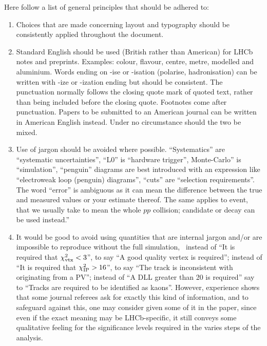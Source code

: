 Here follow a list of general principles that should be adhered to:
\begin{enumerate}

\item Choices that are made concerning layout and typography
  should be consistently applied throughout the document.

\item Standard English should be used (British rather than American)
  for LHCb notes and preprints. Examples: colour, flavour, centre,
  metre, modelled and aluminium. Words ending on -ise or -isation
  (polarise, hadronisation) can be written with -ize or -ization ending but should be consistent.
  The punctuation normally follows the closing quote mark of quoted text, 
  rather than being included before the closing quote.
  Footnotes come after punctuation. 
  Papers to be submitted to an American journal can be written in American
  English instead. Under no circumstance should the two be mixed.

\item Use of jargon should be avoided where possible. ``Systematics'' are ``systematic
  uncertainties'', ``L0'' is ``hardware trigger'', Monte-Carlo'' is ``simulation'', ``penguin'' diagrams
  are best introduced with an expression like ``electroweak loop (penguin) diagrams'', ``cuts'' are ``selection requirements''. The word ``error'' is ambiguous as it can mean the difference between the true and measured values or your estimate thereof. The same applies to event, that we usually take to mean the whole $pp$ collision; candidate or decay can be used instead.''

\item It would be good to avoid using quantities that are internal jargon and/or 
  are impossible to reproduce without the full simulation, \ie\ instead of ``It is 
  required that $\chi^2_{\text{vtx}}<3$'', to say ``A good quality vertex is required''; 
  instead of ``It is required that $\chi^2_{\text{IP}}>16$'', to say ``The track is 
  inconsistent with originating from a PV''; instead of ``A DLL greater 
  than 20 is required'' say to ``Tracks are required to be identified as kaons''.
  However, experience shows that some journal referees ask for exactly this 
  kind of information, and to safeguard against this, one may consider given 
  some of it in the paper, since even if the exact meaning may be LHCb-specific, 
  it still conveys some qualitative feeling for the significance levels required 
  in the varies steps of the analysis.   
 

\end{enumerate}
